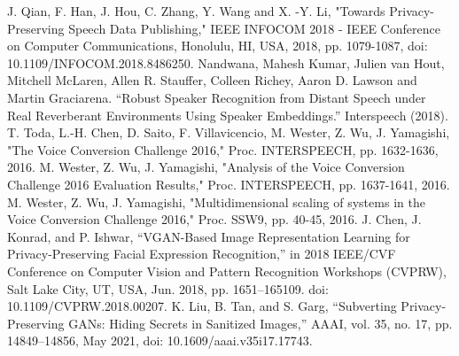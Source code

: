 \documentclass[conference]{IEEEtran}
\begin{document}
\begin{thebibliography}{00}
     J. Qian, F. Han, J. Hou, C. Zhang, Y. Wang and X. -Y. Li, "Towards Privacy-Preserving Speech Data Publishing," IEEE INFOCOM 2018 - IEEE Conference on Computer Communications, Honolulu, HI, USA, 2018, pp. 1079-1087, doi: 10.1109/INFOCOM.2018.8486250.
     Nandwana, Mahesh Kumar, Julien van Hout, Mitchell McLaren, Allen R. Stauffer, Colleen Richey, Aaron D. Lawson and Martin Graciarena. “Robust Speaker Recognition from Distant Speech under Real Reverberant Environments Using Speaker Embeddings.” Interspeech (2018).
     T. Toda, L.-H. Chen, D. Saito, F. Villavicencio, M. Wester, Z. Wu, J. Yamagishi, "The Voice Conversion Challenge 2016," Proc. INTERSPEECH, pp. 1632-1636, 2016.
     M. Wester, Z. Wu, J. Yamagishi, "Analysis of the Voice Conversion Challenge 2016 Evaluation Results," Proc. INTERSPEECH, pp. 1637-1641, 2016.
     M. Wester, Z. Wu, J. Yamagishi, "Multidimensional scaling of systems in the Voice Conversion Challenge 2016," Proc. SSW9, pp. 40-45, 2016.
     J. Chen, J. Konrad, and P. Ishwar, “VGAN-Based Image Representation Learning for Privacy-Preserving Facial Expression Recognition,” in 2018 IEEE/CVF Conference on Computer Vision and Pattern Recognition Workshops (CVPRW), Salt Lake City, UT, USA, Jun. 2018, pp. 1651–165109. doi: 10.1109/CVPRW.2018.00207.
     K. Liu, B. Tan, and S. Garg, “Subverting Privacy-Preserving GANs: Hiding Secrets in Sanitized Images,” AAAI, vol. 35, no. 17, pp. 14849–14856, May 2021, doi: 10.1609/aaai.v35i17.17743.
\end{thebibliography}
\end{document}
